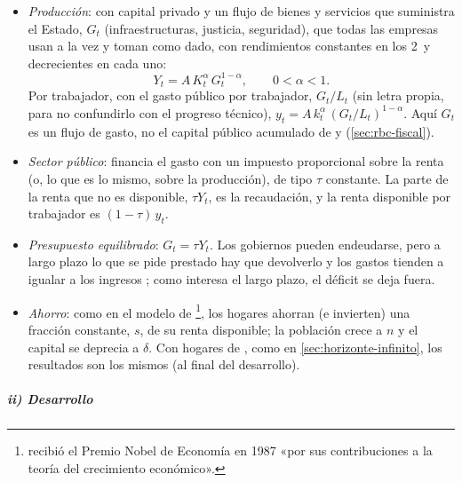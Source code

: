 \documentclass[11pt]{article}
\begin{document}
\begin{itemize}
\item \emph{Producción}: con capital privado y un flujo de bienes y servicios que suministra el Estado, $G_t$ (infraestructuras, justicia, seguridad), que todas las empresas usan a la vez y toman como dado, con rendimientos constantes en los 2~y decrecientes en cada uno:
  \begin{equation}\label{eq:barro-produccion}
  Y_t=A\,K_t^{\alpha}\,G_t^{1-\alpha},\qquad 0<\alpha<1.
  \end{equation}
  Por trabajador, con el gasto público por trabajador, $G_t/L_t$ (sin letra propia, para no confundirlo con el progreso técnico), $y_t=A\,k_t^{\alpha}\,(G_t/L_t)^{1-\alpha}$. Aquí $G_t$ es un flujo de gasto, no el capital público acumulado de  y  (\ref{sec:rbc-fiscal}).
\item \emph{Sector público}: financia el gasto con un impuesto proporcional sobre la renta (o, lo que es lo mismo, sobre la producción), de tipo $\tau$ constante. La parte de la renta que no es disponible, $\tau Y_t$, es la recaudación, y la renta disponible por trabajador es $(1-\tau)\,y_t$.
\item \emph{Presupuesto equilibrado}: $G_t=\tau Y_t$. Los gobiernos pueden endeudarse, pero a largo plazo lo que se pide prestado hay que devolverlo y los gastos tienden a igualar a los ingresos ; como interesa el largo plazo, el déficit se deja fuera.
\item \emph{Ahorro}: como en el modelo de \footnote{ recibió el Premio Nobel de Economía en 1987 «por sus contribuciones a la teoría del crecimiento económico»\nocite{Nobel1987Solow}.}, los hogares ahorran (e invierten) una fracción constante, $s$, de su renta disponible; la población crece a $n$ y el capital se deprecia a $\delta$. Con hogares de , como en \ref{sec:horizonte-infinito}, los resultados son los mismos (al final del desarrollo).
\end{itemize}

\subparagraph{ii) Desarrollo}
\end{document}
